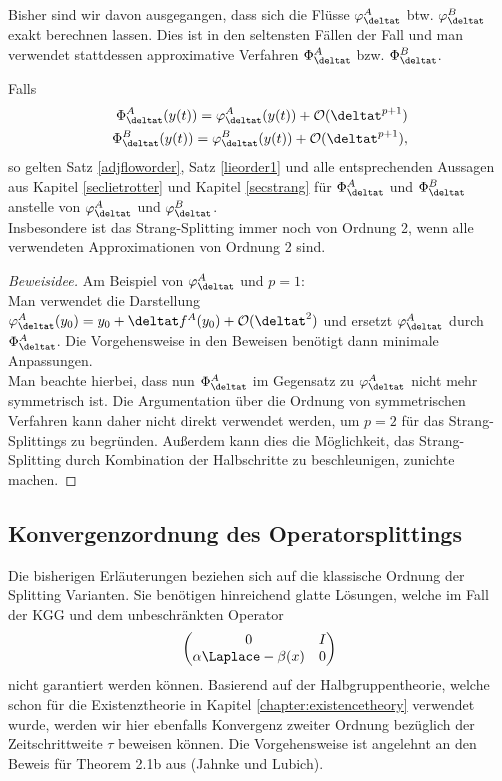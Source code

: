 Bisher sind wir davon ausgegangen, dass sich die Flüsse $\varphi_{\deltat}^A$ btw. $\varphi_{\deltat}^B$ exakt berechnen lassen. Dies ist in den seltensten Fällen der Fall und man verwendet stattdessen approximative Verfahren $\Phi_{\deltat}^A$ bzw. $\Phi_{\deltat}^B$. 
\begin{maththeorem}
Falls
\begin{align*}
\Phi_{\deltat}^A(y(t))=\varphi_{\deltat}^A(y(t))+\mathcal{O}(\deltat^{p+1})\\
\Phi_{\deltat}^B(y(t))=\varphi_{\deltat}^B(y(t))+\mathcal{O}(\deltat^{p+1}),
\end{align*}
so gelten Satz \ref{adjfloworder}, Satz \ref{lieorder1} und alle entsprechenden Aussagen aus Kapitel \ref{seclietrotter} und Kapitel \ref{secstrang} für $\Phi_{\deltat}^A$ und $\Phi_{\deltat}^B$ anstelle von $\varphi_{\deltat}^A$ und $\varphi_{\deltat}^B$.\\
Insbesondere ist das Strang-Splitting immer noch von Ordnung 2, wenn alle verwendeten Approximationen von Ordnung 2 sind.
\end{maththeorem}
\begin{proof}[Beweisidee]
Am Beispiel von $\varphi_{\deltat}^A$ und $p=1$:\\
Man verwendet die Darstellung $\varphi_{\deltat}^A(y_0)=y_0+\deltat f^A(y_0)+\mathcal{O}(\deltat^2)$ und ersetzt $\varphi_{\deltat}^A$ durch $\Phi_{\deltat}^A$. Die Vorgehensweise in den Beweisen benötigt dann minimale Anpassungen.\\
Man beachte hierbei, dass nun $\Phi_{\deltat}^A$ im Gegensatz zu $\varphi_{\deltat}^A$ nicht mehr symmetrisch ist. Die Argumentation über die Ordnung von symmetrischen Verfahren kann daher nicht direkt verwendet werden, um $p=2$ für das Strang-Splittings zu begründen. Außerdem kann dies die Möglichkeit, das Strang-Splitting durch Kombination der Halbschritte zu beschleunigen, zunichte machen.
\end{proof}
\subsection{Konvergenzordnung des Operatorsplittings}
Die bisherigen Erläuterungen beziehen sich auf die klassische Ordnung der Splitting Varianten. Sie benötigen hinreichend glatte Lösungen, welche im Fall der KGG und dem unbeschränkten Operator 
\[\begin{pmatrix}0 & I\\ \alpha\Laplace-\beta(x) & 0\end{pmatrix}\]
nicht garantiert werden können. Basierend auf der Halbgruppentheorie, welche schon für die Existenztheorie in Kapitel \ref{chapter:existencetheory} verwendet wurde, werden wir hier ebenfalls Konvergenz zweiter Ordnung bezüglich der Zeitschrittweite $\tau$ beweisen können. Die Vorgehensweise ist angelehnt an den Beweis für Theorem 2.1b aus \autocite{jahnkelubich2000} (Jahnke und Lubich).
